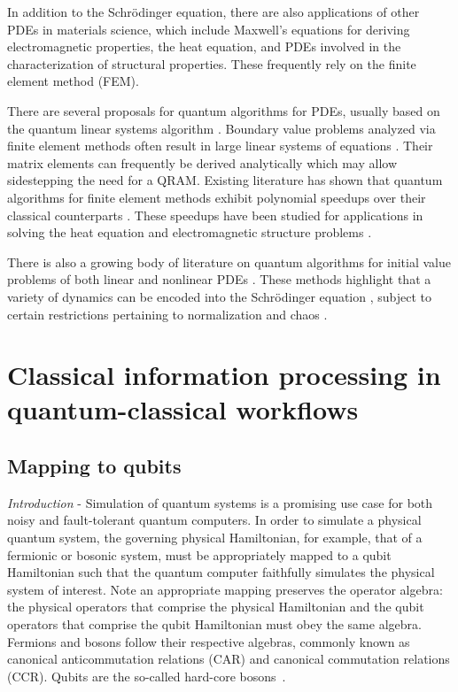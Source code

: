 In addition to the Schr\"odinger equation, there are also applications of other PDEs in materials science, which include Maxwell's equations for deriving electromagnetic properties, the heat equation, and PDEs involved in the characterization of structural properties. These frequently rely on the finite element method (FEM).

There are several proposals for quantum algorithms for PDEs, usually based on the quantum linear systems algorithm \cite{harrow2009quantum}. Boundary value problems analyzed via finite element methods often result in large linear systems of equations \cite{Rao}. Their matrix elements can frequently be derived analytically which may allow sidestepping the need for a QRAM. Existing literature has shown that quantum algorithms for finite element methods exhibit polynomial speedups over their classical counterparts \cite{montanaropallister16}. These speedups have been studied for applications in solving the heat equation \cite{lindenmontanaroshao20} and electromagnetic structure problems \cite{zhangfengzhang21}.



There is also a growing body of literature on quantum algorithms for initial value problems of both linear \cite{berrychildsostranderwang17, fanglintong23} and nonlinear PDEs \cite{krovi22}. These methods highlight that a variety of dynamics can be encoded into the Schr\"odinger equation \cite{jinniuliu22}, subject to certain restrictions pertaining to normalization \cite{anliuwangzhao22} and chaos \cite{lewiseidenbenznadigasubasi23}.


\section{Classical information processing in quantum-classical workflows\label{sec:DataPreprocessing}}

\subsection{Mapping to qubits}
\label{mapping_to_qubits}



{\it Introduction} - Simulation of quantum systems is a promising use case for both noisy and fault-tolerant quantum computers.
In order to simulate a physical quantum system, the governing physical Hamiltonian, for example, that of a fermionic or bosonic system, must be appropriately mapped to a qubit Hamiltonian such that the quantum computer faithfully simulates the physical system of interest.
Note an appropriate mapping preserves the operator algebra: the physical operators that comprise the physical Hamiltonian and the qubit operators that comprise the qubit Hamiltonian must obey the same algebra.
Fermions and bosons follow their respective algebras, commonly known as canonical anticommutation relations (CAR) and canonical commutation relations (CCR).
Qubits are the so-called hard-core bosons~\cite{wu2002qubits}. 


